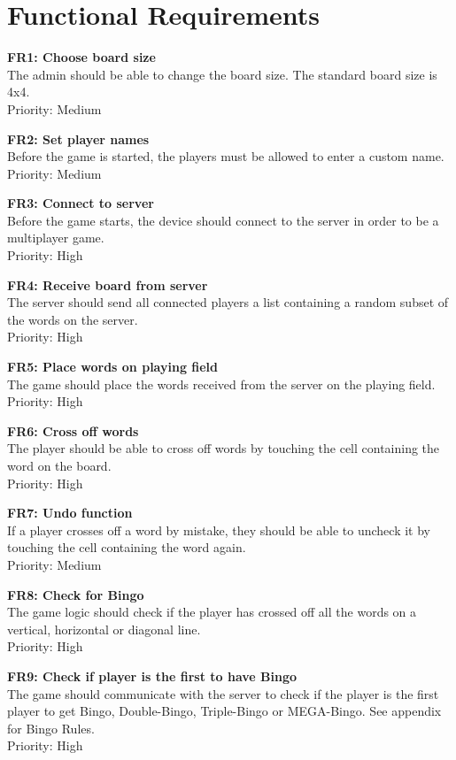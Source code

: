 \section{Functional Requirements} 
\label{sec:functional requirements}

{\bf FR1: Choose board size}\\
The admin should be able to change the board size. The standard board size is
4x4.\\
Priority: Medium

{\bf FR2: Set player names}\\
Before the game is started, the players must be allowed to enter a custom
name.\\
Priority: Medium

{\bf FR3: Connect to server}\\
Before the game starts, the device should connect to the server in order to be
a multiplayer game.\\
Priority: High

{\bf FR4: Receive board from server}\\
The server should send all connected players a list containing a random
subset of the words on the server.\\
Priority: High

{\bf FR5: Place words on playing field}\\
The game should place the words received from the server on the playing
field.\\
Priority: High

{\bf FR6: Cross off words}\\
The player should be able to cross off words by touching the cell containing
the word on the board.\\
Priority: High

{\bf FR7: Undo function}\\
If a player crosses off a word by mistake, they should be able to uncheck it by
touching the cell containing the word again.\\
Priority: Medium

{\bf FR8: Check for Bingo}\\
The game logic should check if the player has crossed off all the words on a
vertical, horizontal or diagonal line.\\
Priority: High

{\bf FR9: Check if player is the first to have Bingo}\\
The game should communicate with the server to check if the player is the first
player to get Bingo, Double-Bingo, Triple-Bingo or MEGA-Bingo. See appendix for
Bingo Rules.\\
Priority: High

